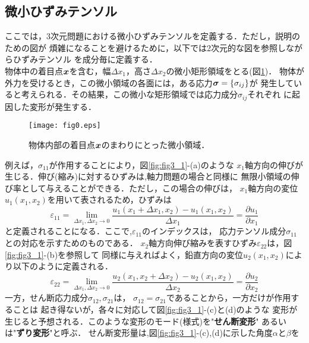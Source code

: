 \documentclass[10pt,a4j]{jarticle}
\begin{document}
\subsection{微小ひずみテンソル}
ここでは，3次元問題における微小ひずみテンソルを定義する．ただし，説明のための図が
煩雑になることを避けるために，以下では2次元的な図を参照しながらひずみテンソル
を成分毎に定義する．\\

物体中の着目点$\mbox{\boldmath $x$}$を含む，幅$\Delta x_1$，高さ$\Delta x_2$の微小矩形領域をとる(図\ref{fig:fig0})．
物体が外力を受けるとき，この微小領域の各面には，ある応力$\mbox{\boldmath $\sigma$}=\{\sigma_{ij}\}$が
発生していると考えられる．その結果，この微小な矩形領域では応力成分$\sigma_{ij}$それぞれ
に起因した変形が発生する．
\begin{figure}[h]
	\begin{center}
	\texttt{[image: fig0.eps]} 
	\end{center}
	\caption{物体内部の着目点$\mbox{\boldmath $x$}$のまわりにとった微小領域．} 
	\label{fig:fig0}
\end{figure}
例えば，$\sigma_{11}$が作用することにより，図\ref{fig:fig3_1}-(a)のような
$x_1$軸方向の伸びが生じる．伸び(縮み)に対するひずみは,軸力問題の場合と同様に
無限小領域の伸び率として与えることができる．ただし，この場合の伸びは，
$x_1$軸方向の変位$u_1(x_1,x_2)$を用いて表されるため，ひずみは
\begin{equation}
	\varepsilon_{11}=\lim_{\Delta x_1,\Delta x_2 \rightarrow 0}
	\frac{u_1(x_1+\Delta x_1,x_2)-u_1(x_1,x_2)}{\Delta x_1}
	=\frac{\partial u_1}{\partial x_1}
	\label{eqn:def_e11}
\end{equation}
と定義されることになる．ここで,$\varepsilon_{11}$のインデックスは，
応力テンソル成分$\sigma_{11}$との対応を示すためのものである．
$x_2$軸方向伸び縮みを表すひずみ$\varepsilon_{22}$は，図\ref{fig:fig3_1}-(b)を参照して
同様に与えればよく，鉛直方向の変位$u_2(x_1,x_2)$により以下のように定義される．
\begin{equation}
	\varepsilon_{22}=\lim_{\Delta x_1,\Delta x_2 \rightarrow 0}
	\frac{u_2(x_1,x_2+\Delta x_2)-u_2(x_1,x_2)}{\Delta x_2}
	=\frac{\partial u_2}{\partial x_2}
	\label{eqn:def_e22}
\end{equation}
一方，せん断応力成分$\sigma_{12}, \sigma_{21}$は，
$\sigma_{12}=\sigma_{21}$であることから，一方だけが作用することは
起き得ないが，各々に対応して図\ref{fig:fig3_1}-(c)と(d)のような
変形が生じると予想される．このような変形のモード(様式)を"{\bf せん断変形}"
あるいは"{\bf ずり変形}"と呼ぶ．
せん断変形量は,図\ref{fig:fig3_1}-(c),(d)に示した角度$\alpha$と$\beta$を
\end{document}
